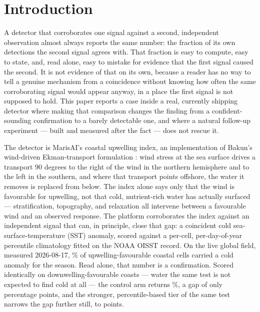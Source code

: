 %

\section{Introduction}

A detector that corroborates one signal against a second, independent
observation almost always reports the same number: the fraction of its own
detections the second signal agrees with. That fraction is easy to compute,
easy to state, and, read alone, easy to mistake for evidence that the first
signal caused the second. It is not evidence of that on its own, because a
reader has no way to tell a genuine mechanism from a coincidence without
knowing how often the same corroborating signal would appear anyway, in a
place the first signal is not supposed to hold. This paper reports a case
inside a real, currently shipping detector where making that comparison
changes the finding from a confident-sounding confirmation to a barely
detectable one, and where a natural follow-up experiment --- built and
measured after the fact --- does not rescue it.

The detector is MarisAI's coastal upwelling index, an implementation of
Bakun's wind-driven Ekman-transport formulation \citep{bakun1990}: wind
stress at the sea surface drives a transport 90 degrees to the right of the
wind in the northern hemisphere and to the left in the southern, and where
that transport points offshore, the water it removes is replaced from below.
The index alone says only that the wind is favourable for upwelling, not
that cold, nutrient-rich water has actually surfaced --- stratification,
topography, and relaxation all intervene between a favourable wind and an
observed response. The platform corroborates the index against an
independent signal that can, in principle, close that gap: a coincident cold
sea-surface-temperature (SST) anomaly, scored against a per-cell,
per-day-of-year percentile climatology fitted on the NOAA OISST record. On
the live global field, measured 2026-08-17, \UpwellFavourWeak{}\% of
upwelling-favourable coastal cells carried a cold anomaly for the season.
Read alone, that number is a confirmation. Scored identically on
downwelling-favourable coasts --- water the same test is not expected to
find cold at all --- the control arm returns \UpwellControlWeak{}\%, a gap of
only \UpwellGapWeak{} percentage points, and the stronger, percentile-based
tier of the same test narrows the gap further still, to \UpwellGapStrong{}
points.

